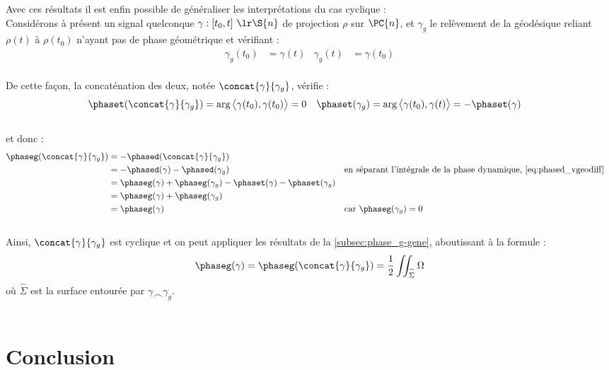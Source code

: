 Avec ces résultats il est enfin possible de généraliser les interprétations du cas cyclique :
\\
Considérons à présent un signal quelconque $\gamma: [t_0,t]\ \lr \S{n}$ de projection $\rho$ sur $\PC{n}$, et $\gamma_g$ le relèvement de la géodésique reliant $\rho(t)$ à $\rho(t_0)$ n'ayant pas de phase géométrique et vérifiant :
\begin{align*}
\gamma_g(t_0) &= \gamma(t)  &  \gamma_g(t) &= \gamma(t_0)
\end{align*}
\\
De cette façon, la concaténation des deux, notée $\concat{\gamma}{\gamma_g}$, vérifie :
\begin{align*}
\phaset(\concat{\gamma}{\gamma_g}) &= \arg\big\langle \gamma(t_0), \gamma(t_0) \big\rangle =0  &  \phaset(\gamma_g) &= \arg\big\langle \gamma(t_0), \gamma(t) \big\rangle = - \phaset(\gamma)
\end{align*}
\\
et donc :
\begin{align*}
\phaseg(\concat{\gamma }{\gamma_g}) &= -\phased(\concat{\gamma }{\gamma_g}) \\
&= -\phased(\gamma) - \phased(\gamma_g)  &  &\text{en séparant l'intégrale de la phase dynamique, \eqref{eq:phased_vgeodiff}} \\
&= \phaseg(\gamma) + \phaseg(\gamma_g) - \phaset(\gamma) - \phaset(\gamma_g) \\
&= \phaseg(\gamma) + \phaseg(\gamma_g) \\
&= \phaseg(\gamma) & &\text{car }\phaseg(\gamma_g) = 0
\end{align*}
\\

Ainsi, $\concat{\gamma}{\gamma_g}$ est cyclique et on peut appliquer les résultats de la \cref{subsec:phase_g-gene}, aboutissant à la formule :
\begin{equation} \label{eq:phase_g-general}
\phaseg(\gamma) = \phaseg(\concat{\gamma }{\gamma_g}) = \frac{1}{2} \iint_{\overset{\frown}{\Sigma}} \Omega
\end{equation}
où $\overset{\frown}{\Sigma}$ est la surface entourée par $\gamma \smallfrown \gamma_g$.
\\

\\



\section{Conclusion}

